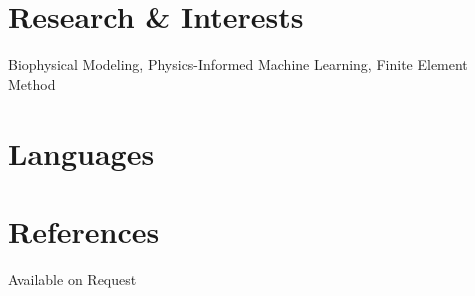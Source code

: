 \documentclass[10pt, a4paper]{article}
\begin{document}
	\section*{Research \& Interests}
	\interestslist
	{
		Biophysical Modeling, 
		Physics-Informed Machine Learning, 
		Finite Element Method
	}

	
		
	
	\section*{Languages}
	
	

	\section*{References}
		Available on Request


		
\end{document}
